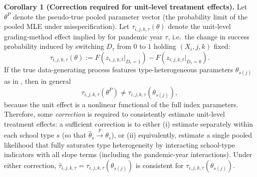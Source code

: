 \documentclass[12pt]{article}
\begin{document}
\vspace{0.5em}
\noindent\textbf{Corollary 1 (Correction required for unit-level treatment effects).}
Let $\theta^{P}$ denote the pseudo-true pooled parameter vector (the probability limit of the pooled MLE under misspecification). Let $\tau_{i,j,k,\tau}(\theta)$ denote the unit-level grading-method effect implied by  for pandemic year $\tau$, i.e.\ the change in success probability induced by switching $D_\tau$ from $0$ to $1$ holding $(X_i,j,k)$ fixed:
\begin{equation}
\label{eq:unit_te_def}
\tau_{i,j,k,\tau}(\theta)
:=
F\!\left(z_{i,j,k,t}\big|_{D_\tau=1}\right)
-
F\!\left(z_{i,j,k,t}\big|_{D_\tau=0}\right).
\end{equation}
If the true data-generating process features type-heterogeneous parameters $\theta_{s(j)}$ as in , then in general
\begin{equation}
\label{eq:unit_te_bias}
\tau_{i,j,k,\tau}\!\left(\theta^{P}\right)
\neq
\tau_{i,j,k,\tau}\!\left(\theta_{s(j)}\right),
\end{equation}
because the unit effect is a nonlinear functional of the full index parameters. Therefore, some \emph{correction} is required to consistently estimate unit-level treatment effects: a sufficient correction is to either (i) estimate  separately within each school type $s$ (so that $\widehat\theta_s\overset{p}{\to}\theta_s$), or (ii) equivalently, estimate a single pooled likelihood that fully saturates type heterogeneity by interacting school-type indicators with all slope terms (including the pandemic-year interactions). Under either correction, $\widehat\tau_{i,j,k,\tau}=\tau_{i,j,k,\tau}(\widehat\theta_{s(j)})$ is consistent for $\tau_{i,j,k,\tau}(\theta_{s(j)})$.
\end{document}
